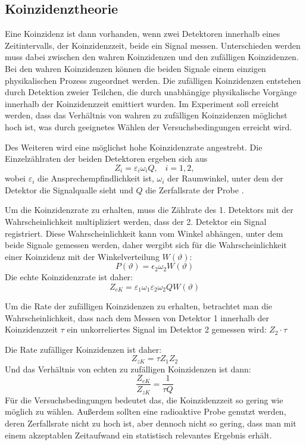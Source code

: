 \documentclass[11pt]{scrartcl}
\begin{document}
\subsection{Koinzidenztheorie}
Eine Koinzidenz ist dann vorhanden, wenn zwei Detektoren
innerhalb eines Zeitintervalls, der Koinzidenzzeit, beide ein 
Signal messen. Unterschieden werden muss dabei zwischen den 
wahren Koinzidenzen und den zufälligen Koinzidenzen. Bei den wahren
Koinzidenzen können die beiden Signale einem einzigen physikalischen
Prozess zugeordnet werden. Die zufälligen Koinzidenzen entstehen
durch Detektion zweier Teilchen, die durch unabhängige physikalische
Vorgänge innerhalb der Koinzidenzzeit emittiert wurden. Im Experiment
soll erreicht werden, dass das Verhältnis von wahren zu zufälligen 
Koinzidenzen möglichst hoch ist, was durch geeignetes Wählen der 
Versuchsbedingungen erreicht wird.

Des Weiteren wird eine möglichst hohe Koinzidenzrate angestrebt. 
Die Einzelzählraten der beiden Detektoren ergeben sich aus
\begin{equation}
 Z_i=\varepsilon_i \omega_i Q, \;\;\; i=1,2,
\end{equation}
wobei $\varepsilon_i$ die Ansprechempfindlichkeit ist, $\omega_i$
der Raumwinkel, unter dem der Detektor die Signalqualle sieht und
$Q$ die Zerfallsrate der Probe \cite{versuch}. 

Um die Koinzidenzrate zu erhalten, muss die Zählrate des 1. Detektors
mit der Wahrscheinlichkeit multipliziert werden, dass der 2. 
Detektor ein Signal registriert. Diese Wahrscheinlichkeit kann 
vom Winkel abhängen, unter dem beide Signale gemessen werden, daher
wergibt sich für die Wahrscheinlichkeit einer Koinzidenz mit der 
Winkelverteilung $W(\vartheta)$:
\begin{equation}
 P(\vartheta)=\epsilon_2\omega_2 W(\vartheta)
\end{equation}
Die echte Koinzidenzrate ist daher:
\begin{equation}
 Z_{eK}=\varepsilon_1 \omega_1 \varepsilon_2 \omega_2 Q W(\vartheta)
\end{equation}

Um die Rate der zufälligen Koinzidenzen zu erhalten, betrachtet man die Wahrscheinlichkeit, dass
nach dem Messen von Detektor 1 innerhalb der Koinzidenzzeit $\tau$ ein unkorreliertes Signal im Detektor 2 
gemessen wird: $Z_2\cdot \tau$

Die Rate zufälliger Koinzidenzen ist daher:
\begin{equation}
 Z_{zK}=\tau Z_1Z_2
\end{equation}
Und das Verhältnis von echten zu zufälligen Koinzidenzen ist dann:
\begin{equation}
 \frac{Z_{eK}}{Z_{zK}}=\frac{1}{\tau Q}
\end{equation}
Für die Versuchsbedingungen bedeutet das, die Koinzidenzzeit so gering wie möglich zu wählen.
Außerdem sollten eine radioaktive Probe genutzt werden, deren Zerfallsrate nicht zu hoch ist,
aber dennoch nicht so gering,
dass man mit einem akzeptablen Zeitaufwand ein statistisch relevantes Ergebnis erhält.
\end{document}
